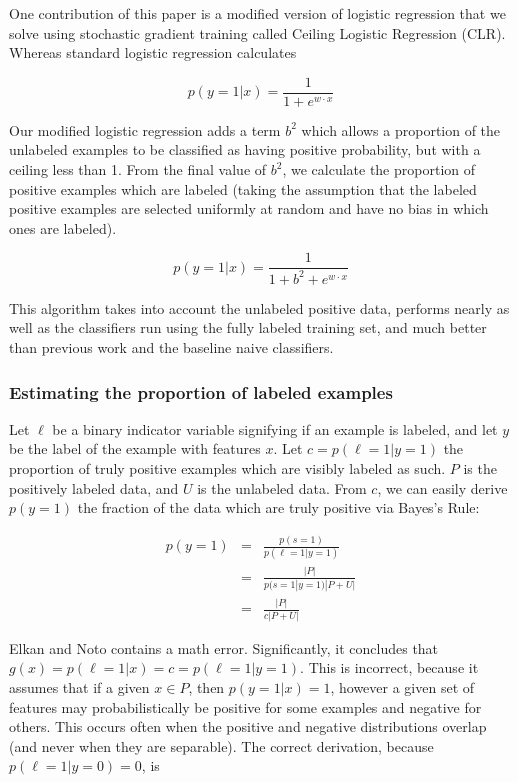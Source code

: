 \documentclass{article}
\begin{document}
One contribution of this paper is a modified version of logistic regression that we solve using stochastic gradient training called Ceiling Logistic Regression (CLR).  Whereas standard logistic regression calculates

$$ p(y=1|x) = \frac{1}{1 + e^{w \cdot x}} $$

Our modified logistic regression adds a term $b^2$ which allows a proportion of the unlabeled examples to be classified as having positive probability, but with a ceiling less than 1. From the final value of $b^2$, we calculate the proportion of positive examples which are labeled (taking the assumption that the labeled positive examples are selected uniformly at random and have no bias in which ones are labeled).

$$ p(y=1|x) = \frac{1}{1 + b^2 + e^{w \cdot x}} $$

This algorithm takes into account the unlabeled positive data, performs nearly as well as the classifiers run using the fully labeled training set, and much better than previous work and the baseline naive classifiers.

\subsubsection{Estimating the proportion of labeled examples}

Let $\ell$ be a binary indicator variable signifying if an example is labeled, and let $y$ be the label of the example with features $x$. Let $c = p(\ell=1|y=1)$ the proportion of truly positive examples which are visibly labeled as such. $P$ is the positively labeled data, and $U$ is the unlabeled data. From $c$, we can easily derive $p(y=1)$ the fraction of the data which are truly positive via Bayes's Rule:

\begin{eqnarray*}
p(y=1) &=& \frac{p(s=1)}{p(\ell = 1|y = 1)} \\
 &=&  \frac{|P|}{p(s = 1|y = 1)|P+U|} \\
 &=& \frac{|P|}{c|P+U|}
\end{eqnarray*}

Elkan and Noto  contains a math error.  Significantly, it concludes that $g(x) = p(\ell=1|x) = c = p(\ell=1|y=1)$. This is incorrect, because it assumes that if a given $x \in P$, then $p(y=1|x) = 1$, however a given set of features may probabilistically be positive for some examples and negative for others. This occurs often when the positive and negative distributions overlap (and never when they are separable). The correct derivation, because $p(\ell=1|y=0)=0$, is
\end{document}
